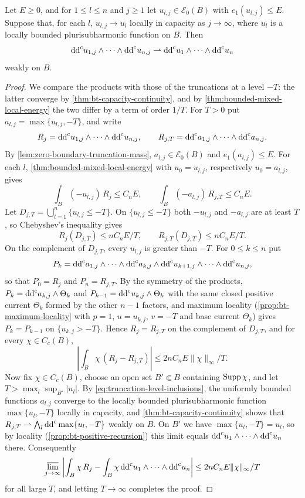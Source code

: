 \begin{corollary}\label{cor:mixed-products-energy-capacity-continuity}
Let $E\geq0$, and for $1\leq l\leq n$ and $j\geq1$ let $u_{l,j}\in\mathcal E_0(B)$ with $e_1(u_{l,j})\leq E$. Suppose that, for each $l$, $u_{l,j}\to u_l$ locally in capacity as $j\to\infty$, where $u_l$ is a locally bounded plurisubharmonic function on $B$. Then
\[
 \mathrm{dd}^{\mathrm{c}} u_{1,j}\wedge\cdots\wedge\mathrm{dd}^{\mathrm{c}} u_{n,j}
          \rightharpoonup\mathrm{dd}^{\mathrm{c}} u_1\wedge\cdots\wedge\mathrm{dd}^{\mathrm{c}} u_n
\]
weakly on $B$.
\end{corollary}
\begin{proof}
We compare the products with those of the truncations at a level $-T$: the latter converge by \cref{thm:bt-capacity-continuity}, and by \cref{thm:bounded-mixed-local-energy} the two differ by a term of order $1/T$. For $T>0$ put $a_{l,j}=\max\{u_{l,j},-T\}$, and write
\[
 R_j=\mathrm{dd}^{\mathrm{c}} u_{1,j}\wedge\cdots\wedge\mathrm{dd}^{\mathrm{c}} u_{n,j},\qquad
 R_{j,T}=\mathrm{dd}^{\mathrm{c}} a_{1,j}\wedge\cdots\wedge\mathrm{dd}^{\mathrm{c}} a_{n,j}.
\]
By \cref{lem:zero-boundary-truncation-mass}, $a_{l,j}\in\mathcal E_0(B)$ and $e_1(a_{l,j})\leq E$. For each $l$, \cref{thm:bounded-mixed-local-energy} with $u_0=u_{l,j}$, respectively $u_0=a_{l,j}$, gives
\[
 \int_B(-u_{l,j})\,R_j\leq C_nE,\qquad\int_B(-a_{l,j})\,R_{j,T}\leq C_nE.
\]
Let $D_{j,T}=\bigcup_{l=1}^n\{u_{l,j}\leq-T\}$. On $\{u_{l,j}\leq-T\}$ both $-u_{l,j}$ and $-a_{l,j}$ are at least $T$, so Chebyshev's inequality gives
\[
 R_j(D_{j,T})\leq nC_nE/T,\qquad R_{j,T}(D_{j,T})\leq nC_nE/T.
\]
On the complement of $D_{j,T}$, every $u_{l,j}$ is greater than $-T$. For $0\leq k\leq n$ put
\[
 P_k=\mathrm{dd}^{\mathrm{c}} a_{1,j}\wedge\cdots\wedge\mathrm{dd}^{\mathrm{c}} a_{k,j}\wedge\mathrm{dd}^{\mathrm{c}} u_{k+1,j}\wedge\cdots\wedge\mathrm{dd}^{\mathrm{c}} u_{n,j},
\]
so that $P_0=R_j$ and $P_n=R_{j,T}$. By the symmetry of the products, $P_k=\mathrm{dd}^{\mathrm{c}} a_{k,j}\wedge\Theta_k$ and $P_{k-1}=\mathrm{dd}^{\mathrm{c}} u_{k,j}\wedge\Theta_k$ with the same closed positive current $\Theta_k$ formed by the other $n-1$ factors, and maximum locality (\cref{prop:bt-maximum-locality} with $p=1$, $u=u_{k,j}$, $v=-T$ and base current $\Theta_k$) gives $P_k=P_{k-1}$ on $\{u_{k,j}>-T\}$. Hence $R_j=R_{j,T}$ on the complement of $D_{j,T}$, and for every $\chi\in C_c(B)$,
\[
 \left|\int_B\chi\,(R_j-R_{j,T})\right|
                    \leq2nC_nE\|\chi\|_\infty/T.
\]
Now fix $\chi\in C_c(B)$, choose an open set $B'\Subset B$ containing $\operatorname{Supp}\chi$, and let $T>\max_l\sup_{B'}|u_l|$. By \eqref{eq:truncation-level-inclusions}, the uniformly bounded functions $a_{l,j}$ converge to the locally bounded plurisubharmonic function $\max\{u_l,-T\}$ locally in capacity, and \cref{thm:bt-capacity-continuity} shows that $R_{j,T}\rightharpoonup\bigwedge_l\mathrm{dd}^{\mathrm{c}}\max\{u_l,-T\}$ weakly on $B$. On $B'$ we have $\max\{u_l,-T\}=u_l$, so by locality (\cref{prop:bt-positive-recursion}) this limit equals $\mathrm{dd}^{\mathrm{c}} u_1\wedge\cdots\wedge\mathrm{dd}^{\mathrm{c}} u_n$ there. Consequently
\[
 \varlimsup_{j\to\infty}\left|\int_B\chi\,R_j-\int_B\chi\,\mathrm{dd}^{\mathrm{c}} u_1\wedge\cdots\wedge\mathrm{dd}^{\mathrm{c}} u_n\right|\leq2nC_nE\|\chi\|_\infty/T
\]
for all large $T$, and letting $T\to\infty$ completes the proof.
\end{proof}
